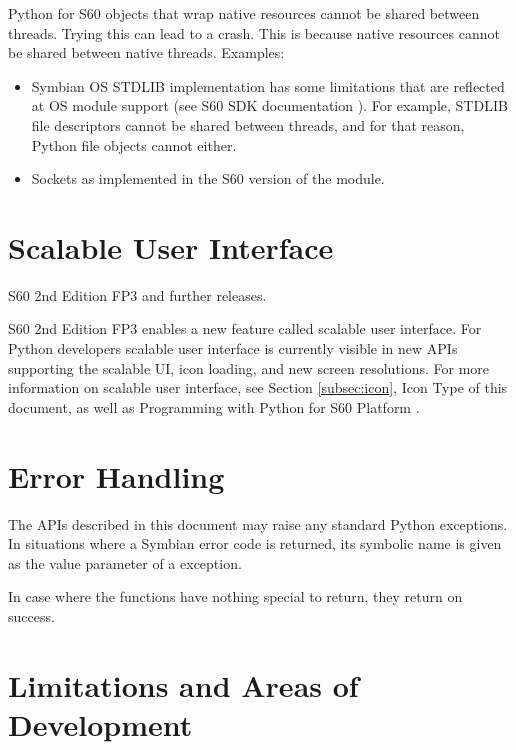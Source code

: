 \begin{notice}[warning]
Python for S60 objects that wrap native resources cannot be shared
between threads. Trying this can lead to a crash. This is because
native resources cannot be shared between native threads. Examples:

\begin{itemize}
\item Symbian OS STDLIB implementation has some limitations that are reflected at OS module support (see S60 SDK documentation \cite{S60Doc}). For example, STDLIB file descriptors cannot be shared between threads, and for that reason, Python file objects cannot either. 
\item Sockets as implemented in the S60 version of the  module.
\end{itemize}
\end{notice}

\section{Scalable User Interface}
\label{sec:scalable}

\begin{notice}[note]
S60 2nd Edition FP3 and further releases.
\end{notice}

S60 2nd Edition FP3 enables a new feature called scalable user interface. 
For Python developers scalable user interface is currently visible in new APIs 
supporting the scalable UI, icon loading, and new screen resolutions. For more 
information on scalable user interface, see Section \ref{subsec:icon}, Icon Type 
of this document, as well as Programming with Python for S60 Platform 
\cite{PyS60Prog}. 

\section{Error Handling}
\label{subsec:error}

The APIs described in this document may raise any standard Python 
exceptions. In situations where a Symbian error code is returned, its 
symbolic name is given as the value parameter of a  
exception.

In case where the functions have nothing special to return, they return 
 on success.

\section{Limitations and Areas of Development}
\label{subsec:limitations}

